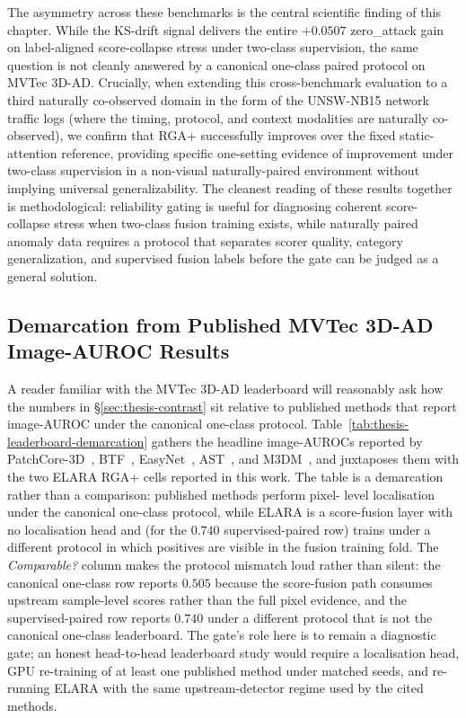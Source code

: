 \documentclass[11pt]{article}
\begin{document}
The asymmetry across these benchmarks is the central scientific finding of this chapter. While the KS-drift signal delivers the entire $+0.0507$ zero\_attack gain on label-aligned score-collapse stress under two-class supervision, the same question is not cleanly answered by a canonical one-class paired protocol on MVTec 3D-AD. Crucially, when extending this cross-benchmark evaluation to a third naturally co-observed domain in the form of the UNSW-NB15 network traffic logs (where the timing, protocol, and context modalities are naturally co-observed), we confirm that RGA+ successfully improves over the fixed static-attention reference, providing specific one-setting evidence of improvement under two-class supervision in a non-visual naturally-paired environment without implying universal generalizability. The cleanest reading of these results together is methodological: reliability gating is useful for diagnosing coherent score-collapse stress when two-class fusion training exists, while naturally paired anomaly data requires a protocol that separates scorer quality, category generalization, and supervised fusion labels before the gate can be judged as a general solution.

\subsection{Demarcation from Published MVTec 3D-AD Image-AUROC Results}
\label{sec:thesis-leaderboard-demarcation}

A reader familiar with the MVTec 3D-AD leaderboard will reasonably ask
how the numbers in §\ref{sec:thesis-contrast} sit relative to published
methods that report image-AUROC under the canonical one-class protocol.
Table~\ref{tab:thesis-leaderboard-demarcation} gathers the headline
image-AUROCs reported by PatchCore-3D~\cite{roth2022patchcore},
BTF~\cite{horwitz2023btf}, EasyNet~\cite{chen2023easynet},
AST~\cite{rudolph2023ast}, and M3DM~\cite{wang2023m3dm}, and juxtaposes
them with the two ELARA RGA+ cells reported in this work. The table is
a demarcation rather than a comparison: published methods perform pixel-
level localisation under the canonical one-class protocol, while ELARA
is a score-fusion layer with no localisation head and (for the
$0.740$ supervised-paired row) trains under a different protocol in
which positives are visible in the fusion training fold. The
\emph{Comparable?} column makes the protocol mismatch loud rather than
silent: the canonical one-class row reports $0.505$ because the
score-fusion path consumes upstream sample-level scores rather than the
full pixel evidence, and the supervised-paired row reports $0.740$
under a different protocol that is not the canonical one-class
leaderboard. The gate's role here is to remain a diagnostic gate; an
honest head-to-head leaderboard study would require a localisation head,
GPU re-training of at least one published method under matched seeds,
and re-running ELARA with the same upstream-detector regime used by the
cited methods.
\end{document}

